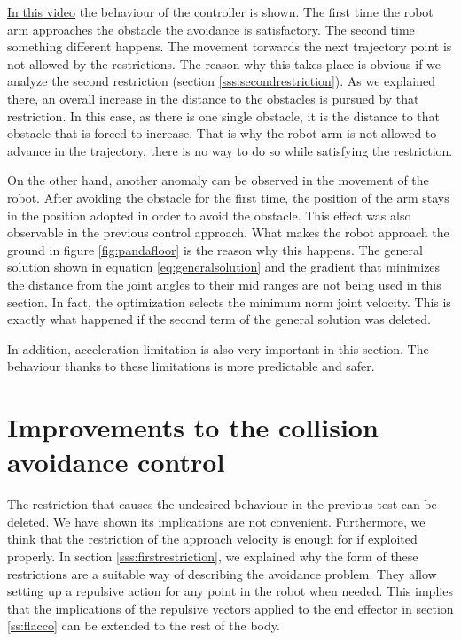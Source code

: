 \href{https://www.youtube.com/watch?v=eJjqcIr-7Qw&list=PLnhdDYfKdsgimnQTQO-bmtKj-KRdbvGgS&index=7&t=0s}{In this video} the behaviour of the controller is shown. The first time the robot arm approaches the obstacle the avoidance is satisfactory. The second time something different happens. The movement torwards the next trajectory point is not allowed by the restrictions. The reason why this takes place is obvious if we analyze the second restriction (section \ref{sss:secondrestriction}). As we explained there, an overall increase in the distance to the obstacles is pursued by that restriction. In this case, as there is one single obstacle, it is the distance to that obstacle that is forced to increase. That is why the robot arm is not allowed to advance in the trajectory, there is no way to do so while satisfying the restriction.

On the other hand, another anomaly can be observed in the movement of the robot. After avoiding the obstacle for the first time, the position of the arm stays in the position adopted in order to avoid the obstacle. This effect was also observable in the previous control approach. What makes the robot approach the ground in figure \ref{fig:pandafloor} is the reason why this happens. The general solution shown in equation \ref{eq:generalsolution} and the gradient that minimizes the distance from the joint angles to their mid ranges are not being used in this section. In fact, the optimization selects the minimum norm joint velocity. This is exactly what happened if the second term of the general solution was deleted.

In addition, acceleration limitation is also very important in this section. The behaviour thanks to these limitations is more predictable and safer.

\section{Improvements to the collision avoidance control}
\label{s:improvements}

The restriction that causes the undesired behaviour in the previous test can be deleted. We have shown its implications are not convenient. Furthermore, we think that the restriction of the approach velocity is enough for if exploited properly. In section \ref{sss:firstrestriction}, we explained why the form of these restrictions are a suitable way of describing the avoidance problem. They allow setting up a repulsive action for any point in the robot when needed. This implies that the implications of the repulsive vectors applied to the end effector in section \ref{ss:flacco} can be extended to the rest of the body.

